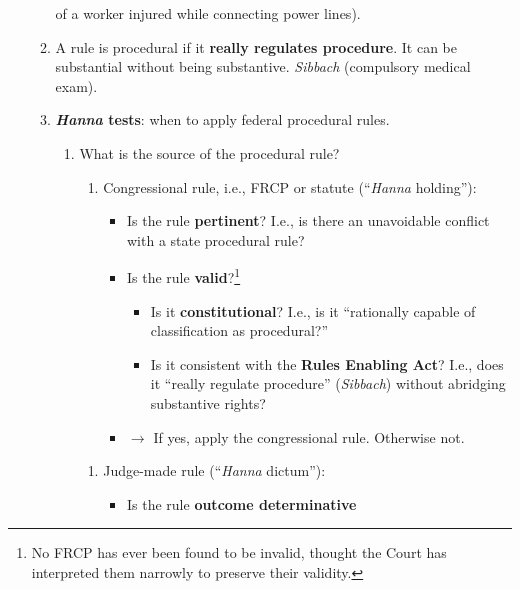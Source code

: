 \begin{enumerate}
\begin{enumerate}
        of a worker injured while connecting power lines).
        \item A rule is procedural if it \textbf{really regulates procedure}. 
        It can be substantial without being substantive. \emph{Sibbach} 
        (compulsory medical exam).
        \item \textbf{\emph{Hanna} tests}: when to apply federal procedural 
        rules.
        \begin{enumerate}
            \item What is the source of the procedural rule?
            \begin{enumerate}
                \item Congressional rule, i.e., FRCP or statute 
                (``\emph{Hanna} holding''):
                \begin{itemize}
                    \item Is the rule \textbf{pertinent}? I.e., is there an 
                    unavoidable conflict with a state procedural rule?
                    \item Is the rule \textbf{valid}?\footnote{No FRCP has 
                    ever been found to be invalid, thought the Court has 
                    interpreted them narrowly to preserve their validity.}
                    \begin{itemize}
                        \item Is it \textbf{constitutional}? I.e., is it 
                        ``rationally capable of classification as 
                        procedural?''
                        \item Is it consistent with the \textbf{Rules Enabling 
                        Act}? I.e., does it ``really regulate procedure'' 
                        (\emph{Sibbach}) without abridging substantive rights?
                    \end{itemize}
                    \item $\rightarrow$ If yes, apply the congressional rule.  
                    Otherwise not.
                \end{itemize}
            \end{enumerate}
            \begin{enumerate}
                \item Judge-made rule (``\emph{Hanna} dictum''):
                \begin{itemize}
                    \item Is the rule \textbf{outcome determinative} 

\end{itemize}
\end{enumerate}
\end{enumerate}
\end{enumerate}
\end{enumerate}
